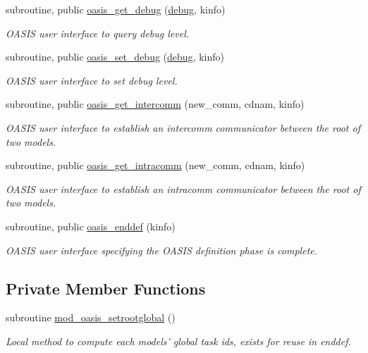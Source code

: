 \begin{DoxyCompactItemize}
subroutine, public \hyperlink{classmod__oasis__method_a8f11010f5ff62cbb10468b8a5df2685c}{oasis\+\_\+get\+\_\+debug} (\hyperlink{classmod__oasis__method_a390290b92b6af57b2732cb7521532f1c}{debug}, kinfo)
\begin{DoxyCompactList}\small\item\em O\+A\+S\+I\+S user interface to query debug level. \end{DoxyCompactList}\item 
subroutine, public \hyperlink{classmod__oasis__method_a92d2b8f49bb31c638f59fc45ec5d1f4c}{oasis\+\_\+set\+\_\+debug} (\hyperlink{classmod__oasis__method_a390290b92b6af57b2732cb7521532f1c}{debug}, kinfo)
\begin{DoxyCompactList}\small\item\em O\+A\+S\+I\+S user interface to set debug level. \end{DoxyCompactList}\item 
subroutine, public \hyperlink{classmod__oasis__method_a3fd0bd0dd8d7274faea9b12eacd1e7a8}{oasis\+\_\+get\+\_\+intercomm} (new\+\_\+comm, cdnam, kinfo)
\begin{DoxyCompactList}\small\item\em O\+A\+S\+I\+S user interface to establish an intercomm communicator between the root of two models. \end{DoxyCompactList}\item 
subroutine, public \hyperlink{classmod__oasis__method_a691517fc5a11d701664061a7dc5bcb83}{oasis\+\_\+get\+\_\+intracomm} (new\+\_\+comm, cdnam, kinfo)
\begin{DoxyCompactList}\small\item\em O\+A\+S\+I\+S user interface to establish an intracomm communicator between the root of two models. \end{DoxyCompactList}\item 
subroutine, public \hyperlink{classmod__oasis__method_a093552f9f9895ac79a5fefa043fc5881}{oasis\+\_\+enddef} (kinfo)
\begin{DoxyCompactList}\small\item\em O\+A\+S\+I\+S user interface specifying the O\+A\+S\+I\+S definition phase is complete. \end{DoxyCompactList}\end{DoxyCompactItemize}
\subsection*{Private Member Functions}
\begin{DoxyCompactItemize}
\item 
subroutine \hyperlink{classmod__oasis__method_a13d6e469ea14642a2e1e6cb807d9b7de}{mod\+\_\+oasis\+\_\+setrootglobal} ()
\begin{DoxyCompactList}\small\item\em Local method to compute each models' global task ids, exists for reuse in enddef. \end{DoxyCompactList}\end{DoxyCompactItemize}
